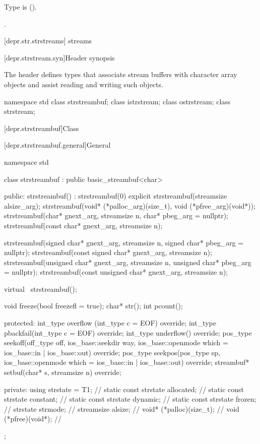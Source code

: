 \begin{itemdescr}
\pnum
\requires
Type  is  ().

\pnum
\returns
{}.
\end{itemdescr}

[depr.str.strstreams]{ streams}

[depr.strstream.syn]{Header  synopsis}

\pnum
The header 
defines types that associate stream buffers with
character array objects and assist reading and writing such objects.

\begin{codeblock}
namespace std {
  class strstreambuf;
  class istrstream;
  class ostrstream;
  class strstream;
}
\end{codeblock}

[depr.strstreambuf]{Class }

[depr.strstreambuf.general]{General}

%
\begin{codeblock}
namespace std {
  class strstreambuf : public basic_streambuf<char> {
  public:
    strstreambuf() : strstreambuf(0) {}
    explicit strstreambuf(streamsize alsize_arg);
    strstreambuf(void* (*palloc_arg)(size_t), void (*pfree_arg)(void*));
    strstreambuf(char* gnext_arg, streamsize n, char* pbeg_arg = nullptr);
    strstreambuf(const char* gnext_arg, streamsize n);

    strstreambuf(signed char* gnext_arg, streamsize n,
                 signed char* pbeg_arg = nullptr);
    strstreambuf(const signed char* gnext_arg, streamsize n);
    strstreambuf(unsigned char* gnext_arg, streamsize n,
                 unsigned char* pbeg_arg = nullptr);
    strstreambuf(const unsigned char* gnext_arg, streamsize n);

    virtual ~strstreambuf();

    void  freeze(bool freezefl = true);
    char* str();
    int   pcount();

  protected:
    int_type overflow (int_type c = EOF) override;
    int_type pbackfail(int_type c = EOF) override;
    int_type underflow() override;
    pos_type seekoff(off_type off, ios_base::seekdir way,
                     ios_base::openmode which = ios_base::in | ios_base::out) override;
    pos_type seekpos(pos_type sp,
                     ios_base::openmode which = ios_base::in | ios_base::out) override;
    streambuf* setbuf(char* s, streamsize n) override;

  private:
    using strstate = T1;                // \expos
    static const strstate allocated;    // \expos
    static const strstate constant;     // \expos
    static const strstate dynamic;      // \expos
    static const strstate frozen;       // \expos
    strstate strmode;                   // \expos
    streamsize alsize;                  // \expos
    void* (*palloc)(size_t);            // \expos
    void (*pfree)(void*);               // \expos
  };
}
\end{codeblock}

